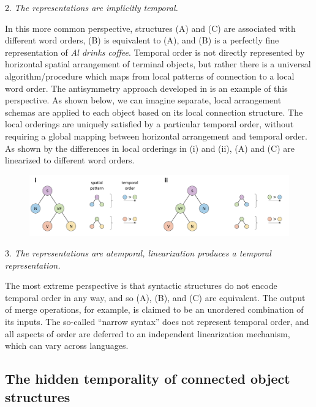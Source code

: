 2. \textit{The representations are implicitly temporal.}

  In this more common perspective, structures (A) and (C) are associated with different word orders, (B) is equivalent to (A), and (B) is a perfectly fine representation of \textit{Al drinks coffee}. Temporal order is not directly represented by horizontal spatial arrangement of terminal objects, but rather there is a universal algorithm/procedure which maps from local patterns of connection to a local word order. The antisymmetry approach developed in \citet{Kayne1994} is an example of this perspective. As shown below, we can imagine separate, local arrangement schemas are applied to each object based on its local connection structure. The local orderings are uniquely satisfied by a particular temporal order, without requiring a global mapping between horizontal arrangement and temporal order. As shown by the differences in local orderings in (i) and (ii), (A) and (C) are linearized to different word orders.

  
\begin{figure}
\includegraphics[width=\textwidth]{figures/Tilsen-img41.png}
\caption{\missingcaption}
\label{fig:}
\end{figure}
 

3. \textit{The representations are atemporal, linearization produces a temporal representation.}

  The most extreme perspective is that syntactic structures do not encode temporal order in any way, and so (A), (B), and (C) are equivalent. The output of merge operations, for example, is claimed to be an unordered combination of its inputs. The so-called “narrow syntax” does not represent temporal order, and all aspects of order are deferred to an independent linearization mechanism, which can vary across languages. 

\subsection{The hidden temporality of connected object structures}

